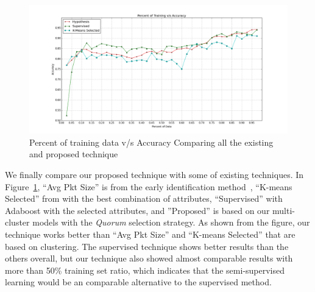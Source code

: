 \documentclass[conference]{IEEEtran}
\begin{document}
\begin{figure}[!t]
	\centering
	\includegraphics[width=1\columnwidth]{super_hypo_accuracy_percent_training}
	\caption{Percent of training data v/s Accuracy Comparing all the existing and proposed technique}
	\label{fig:super_hypo}
\end{figure}

We finally compare our proposed technique with some of existing techniques.
In Figure~\ref{fig:super_hypo}, ``Avg Pkt Size'' is from the early identification method~\cite{Bernaille:2006:EAI:1368436.1368445}, ``K-means Selected'' from \cite{Erman:2006:TCU:1162678.1162679} with the best combination of attributes, ``Supervised'' with Adaboost with the selected attributes, and ''Proposed'' is based on our multi-cluster models with the \emph{Quorum} selection strategy.
As shown from the figure, our technique works better than ``Avg Pkt Size'' and ``K-means Selected'' that are based on clustering.
The supervised technique shows better results than the others overall, but our technique also showed almost comparable results with more than 50\% training set ratio, which indicates that the semi-supervised learning would be an comparable alternative to the supervised method.


%
%
\end{document}
